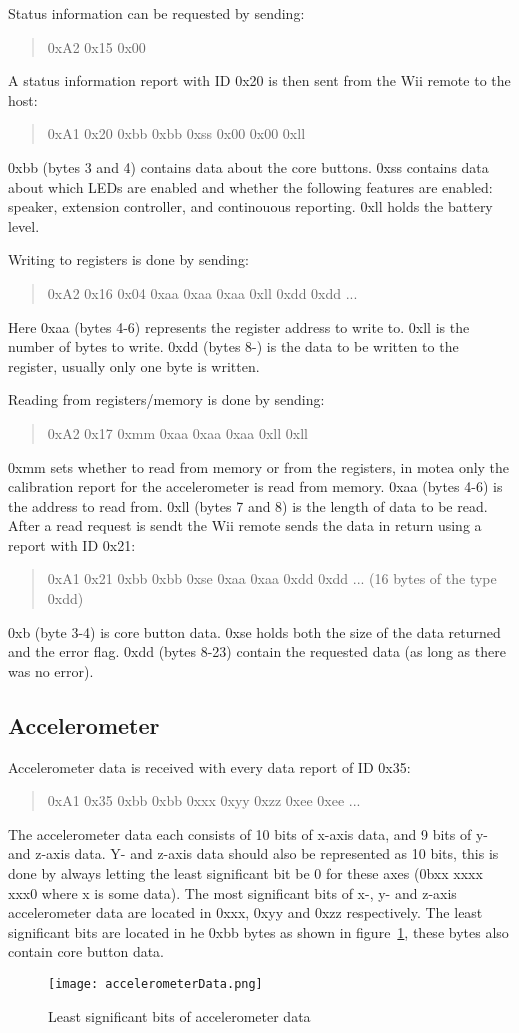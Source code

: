 Status information can be requested by sending:
\begin{quote}
0xA2 0x15 0x00
\end{quote}
A status information report with ID 0x20 is then sent from the Wii remote to the host:
\begin{quote}
0xA1 0x20 0xbb 0xbb 0xss 0x00 0x00 0xll
\end{quote}
0xbb (bytes 3 and 4) contains data about the core buttons. 0xss contains data about which LEDs are enabled and whether the following features are enabled: speaker, extension controller, and continouous reporting. 0xll holds the battery level. 

Writing to registers is done by sending:
\begin{quote}
0xA2 0x16 0x04 0xaa 0xaa 0xaa 0xll 0xdd 0xdd ...
\end{quote}
Here 0xaa (bytes 4-6) represents the register address to write to. 0xll is the number of bytes to write. 0xdd (bytes 8-) is the data to be written to the register, usually only one byte is written.

Reading from registers/memory is done by sending:
\begin{quote}
0xA2 0x17 0xmm 0xaa 0xaa 0xaa 0xll 0xll
\end{quote}
0xmm sets whether to read from memory or from the registers, in motea only the calibration report for the accelerometer is read from memory. 0xaa (bytes 4-6) is the address to read from. 0xll (bytes 7 and 8) is the length of data to be read. After a read request is sendt the Wii remote sends the data in return using a report with ID 0x21:
\begin{quote}
0xA1 0x21 0xbb 0xbb 0xse 0xaa 0xaa 0xdd 0xdd ... (16 bytes of the type 0xdd)
\end{quote}
0xb (byte 3-4) is core button data. 0xse holds both the size of the data returned and the error flag. 0xdd (bytes 8-23) contain the requested data (as long as there was no error).

\subsection{Accelerometer}
Accelerometer data is received with every data report of ID 0x35:
\begin{quote}
0xA1 0x35 0xbb 0xbb 0xxx 0xyy 0xzz 0xee 0xee ...
\end{quote}
The accelerometer data each consists of 10 bits of x-axis data, and 9 bits of y- and z-axis data. Y- and z-axis data should also be represented as 10 bits, this is done by always letting the least significant bit be 0 for these axes (0bxx xxxx xxx0 where x is some data). The most significant bits of x-, y- and z-axis accelerometer data are located in 0xxx, 0xyy and 0xzz respectively. The least significant bits are located in he 0xbb bytes as shown in figure~\ref{fig:accelerometerData}, these bytes also contain core button data.
\begin{figure}[h!]
\texttt{[image: accelerometerData.png]}
\caption{\footnotesize Least significant bits of accelerometer data}
\label{fig:accelerometerData}
\end{figure}

